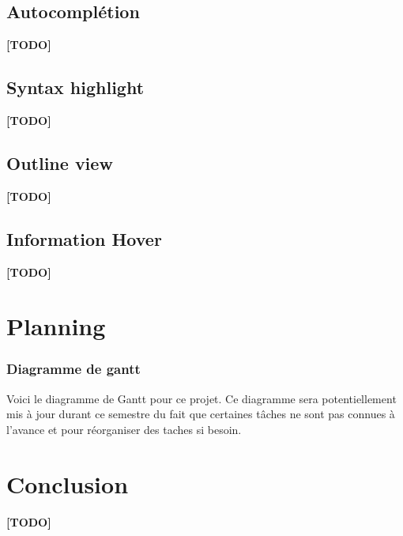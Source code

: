 \documentclass[
    iict, %
    il, %
]{heig-tb}
\begin{document}
\section{Autocomplétion}
\textbf{[TODO]}

\section{Syntax highlight}
\textbf{[TODO]}

\section{Outline view}
\textbf{[TODO]}

\section{Information Hover}
\textbf{[TODO]}

\chapter{Planning}
\subsection{Diagramme de gantt}
Voici le diagramme de Gantt pour ce projet.
Ce diagramme sera potentiellement mis à jour durant ce semestre du fait que certaines tâches ne sont pas connues à l'avance et pour réorganiser des taches si besoin.



\chapter{Conclusion}
\textbf{[TODO]}



\printbibliography
{}
\end{document}
